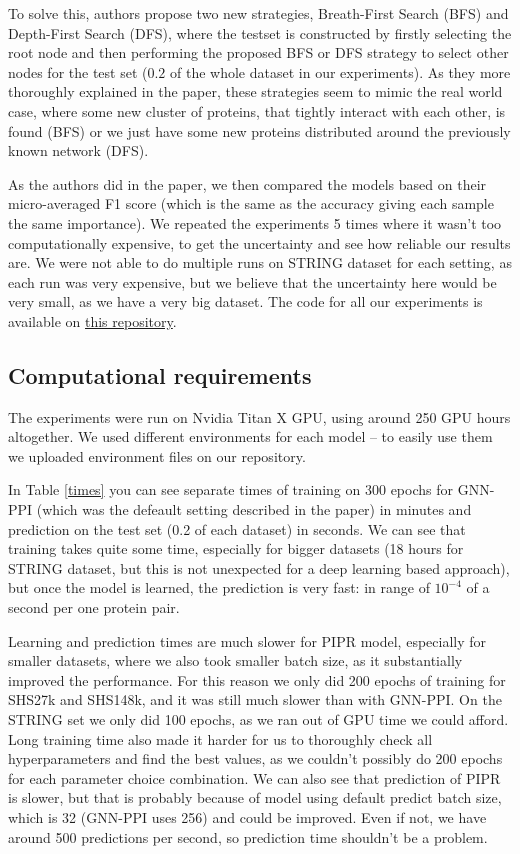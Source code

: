 To solve this, authors propose two new strategies, Breath-First Search (BFS) and Depth-First Search (DFS), where the testset is constructed by firstly selecting the root node and then performing
the proposed BFS or DFS strategy to select other nodes for the test set ($0.2$ of the whole dataset in our experiments). As they more thoroughly explained in the paper, these strategies seem to mimic the real world case, where some new cluster of proteins, that tightly interact with each other, is found (BFS) or we just have some new proteins distributed around the previously known network (DFS).

As the authors did in the paper, we then compared the models based on their micro-averaged F1 score (which is the same as the accuracy giving each sample the same importance). We repeated the experiments 5 times where it wasn't too computationally expensive, to get the uncertainty and see how reliable our results are. We were not able to do multiple runs on STRING dataset for each setting, as each run was very expensive, but we believe that the uncertainty here would be very small, as we have a very big dataset.
The code for all our experiments is available on \href{https://anonymous.4open.science/r/Reproducibility-Challenge-B3A1/README.md}{this repository}.

\subsection{Computational requirements}
The experiments were run on Nvidia Titan X GPU, using around 250 GPU hours altogether. We used different environments for each model -- to easily use them we uploaded environment files on our repository.

In Table \ref{times} you can see separate times of training on 300 epochs for GNN-PPI (which was the defeault setting described in the paper) in minutes and prediction on the test set (0.2 of each dataset) in seconds. We can see that training takes quite some time, especially for bigger datasets (18 hours for STRING dataset, but this is not unexpected for a deep learning based approach), but once the model is learned, the prediction is very fast: in range of $10^{-4}$ of a second per one protein pair.

Learning and prediction times are much slower for PIPR model, especially for smaller datasets, where we also took smaller batch size, as it substantially improved the performance. For this reason we only did 200 epochs of training for SHS27k and SHS148k, and it was still much slower than with GNN-PPI. On the STRING set we only did 100 epochs, as we ran out of GPU time we could afford. 
Long training time also made it harder for us to thoroughly check all hyperparameters and find the best values, as we couldn't possibly do 200 epochs for each parameter choice combination.
We can also see that prediction of PIPR is slower, but that is probably because of model using default predict batch size, which is 32 (GNN-PPI uses 256) and could be improved. Even if not, we have around 500 predictions per second, so prediction time shouldn't be a problem.

